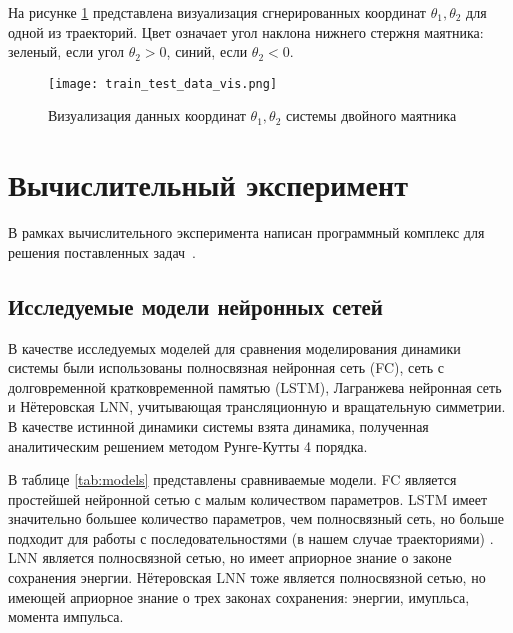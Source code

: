 \documentclass[12pt]{article}
\begin{document}
На рисунке \ref{fig:coords_vis} представлена визуализация сгнерированных координат $\theta_1, \theta_2$ для одной из траекторий. Цвет означает угол наклона нижнего стержня маятника: зеленый, если угол $\theta_2 > 0$, синий, если $\theta_2 < 0$.
 
\begin{figure}[H]
	\centering
	\texttt{[image: train\_test\_data\_vis.png]}
	\caption{Визуализация данных координат $\theta_1, \theta_2$ системы двойного маятника}
	\label{fig:coords_vis}
\end{figure}


\section{Вычислительный эксперимент}
В рамках вычислительного эксперимента написан программный комплекс для решения поставленных задач~\cite{source_code}.

\subsection{Исследуемые модели нейронных сетей}
В качестве исследуемых моделей для сравнения моделирования динамики системы были использованы полносвязная нейронная сеть (FC), сеть с долговременной кратковременной памятью (LSTM), Лагранжева нейронная сеть и Нётеровская LNN, учитывающая трансляционную и вращательную симметрии. В качестве истинной динамики системы взята динамика, полученная аналитическим решением методом Рунге-Кутты 4 порядка.

В таблице \ref{tab:models} представлены сравниваемые модели. FC является простейшей нейронной сетью с малым количеством параметров. LSTM имеет значительно большее количество параметров, чем полносвязный сеть, но больше подходит для работы с последовательностями (в нашем случае траекториями) \cite{lstm}. LNN является полносвязной сетью, но имеет априорное знание о законе сохранения энергии. Нётеровская LNN тоже является полносвязной сетью, но имеющей априорное знание о трех законах сохранения: энергии, имупльса, момента импульса.
\end{document}
